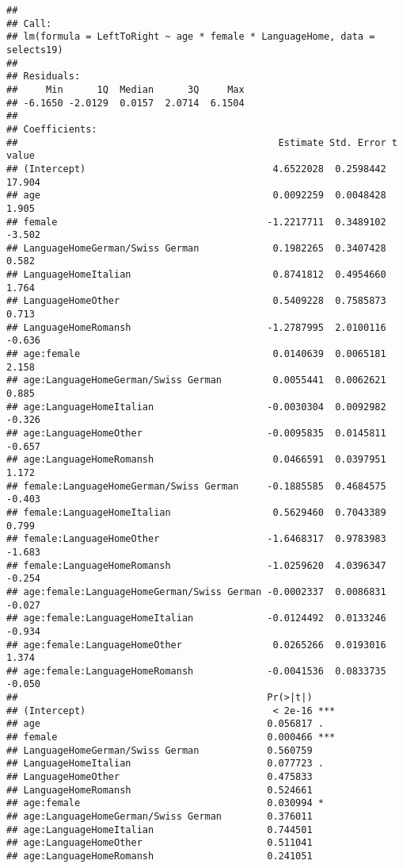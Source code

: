 \documentclass[
]{book}
\begin{document}
\begin{verbatim}
## 
## Call:
## lm(formula = LeftToRight ~ age * female * LanguageHome, data = selects19)
## 
## Residuals:
##     Min      1Q  Median      3Q     Max 
## -6.1650 -2.0129  0.0157  2.0714  6.1504 
## 
## Coefficients:
##                                              Estimate Std. Error t value
## (Intercept)                                 4.6522028  0.2598442  17.904
## age                                         0.0092259  0.0048428   1.905
## female                                     -1.2217711  0.3489102  -3.502
## LanguageHomeGerman/Swiss German             0.1982265  0.3407428   0.582
## LanguageHomeItalian                         0.8741812  0.4954660   1.764
## LanguageHomeOther                           0.5409228  0.7585873   0.713
## LanguageHomeRomansh                        -1.2787995  2.0100116  -0.636
## age:female                                  0.0140639  0.0065181   2.158
## age:LanguageHomeGerman/Swiss German         0.0055441  0.0062621   0.885
## age:LanguageHomeItalian                    -0.0030304  0.0092982  -0.326
## age:LanguageHomeOther                      -0.0095835  0.0145811  -0.657
## age:LanguageHomeRomansh                     0.0466591  0.0397951   1.172
## female:LanguageHomeGerman/Swiss German     -0.1885585  0.4684575  -0.403
## female:LanguageHomeItalian                  0.5629460  0.7043389   0.799
## female:LanguageHomeOther                   -1.6468317  0.9783983  -1.683
## female:LanguageHomeRomansh                 -1.0259620  4.0396347  -0.254
## age:female:LanguageHomeGerman/Swiss German -0.0002337  0.0086831  -0.027
## age:female:LanguageHomeItalian             -0.0124492  0.0133246  -0.934
## age:female:LanguageHomeOther                0.0265266  0.0193016   1.374
## age:female:LanguageHomeRomansh             -0.0041536  0.0833735  -0.050
##                                            Pr(>|t|)    
## (Intercept)                                 < 2e-16 ***
## age                                        0.056817 .  
## female                                     0.000466 ***
## LanguageHomeGerman/Swiss German            0.560759    
## LanguageHomeItalian                        0.077723 .  
## LanguageHomeOther                          0.475833    
## LanguageHomeRomansh                        0.524661    
## age:female                                 0.030994 *  
## age:LanguageHomeGerman/Swiss German        0.376011    
## age:LanguageHomeItalian                    0.744501    
## age:LanguageHomeOther                      0.511041    
## age:LanguageHomeRomansh                    0.241051    

\end{verbatim}
\end{document}
